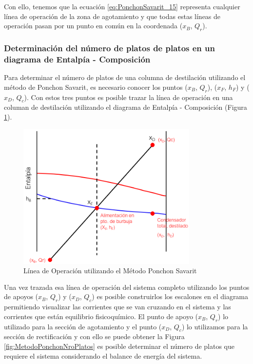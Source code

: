 \documentclass[11pt]{book}
\begin{document}
Con ello, tenemos que la ecuación \ref{eq:PonchonSavarit_15} representa cualquier línea de operación de la zona de agotamiento y que todas estas líneas de operación pasan por un punto en común en la coordenada ($x_B$, $Q_r$).

\subsubsection{Determinación del número de platos de platos en un diagrama de Entalpía - Composición}

Para determinar el número de platos de una columna de destilación utilizando el método de Ponchon Savarit, es necesario conocer los puntos ($x_B$, $Q_r$), ($x_F$, $h_F$) y ($x_D$, $Q_c$). Con estos tres puntos es posible trazar la línea de operación en una columan de destilación utilizando el diagrama de Entalpía - Composición (Figura \ref{fig:MetodoPonchonSavarit_1}).

\begin{figure}
    \centering
    \includegraphics[width=9cm]{img/destilacion/PonchonSavaritLineaOperacion.png}
    \caption{Línea de Operación utilizando el Método Ponchon Savarit}
    \label{fig:MetodoPonchonSavarit_1}
\end{figure}

Una vez trazada esa línea de operación del sistema completo utilizando los puntos de apoyos ($x_B$, $Q_r$) y ($x_D$, $Q_c$) es posible construirlos los escalones en el diagrama permitiendo visualizar las corrientes que se van cruzando en el sistema y las corrientes que están equilibrio fisicoquímico. El punto de apoyo ($x_B$, $Q_r$) lo utilizado para la sección de agotamiento y el punto ($x_D$, $Q_c$) lo utilizamos para la sección de rectificación y con ello se puede obtener la Figura \ref{fig:MetodoPonchonNroPlatos} es posible determinar el número de platos que requiere el sistema considerando el balance de energía del sistema.
\end{document}

